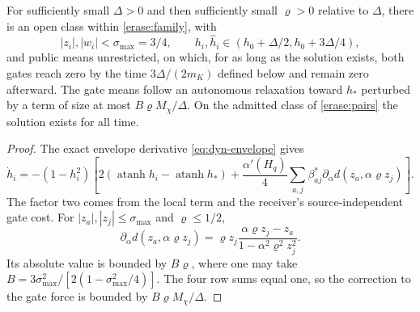 For sufficiently small $\Delta>0$ and then sufficiently small $\varrho>0$ relative to $\Delta$, there is an open class within \cref{erase:family}, with
\begin{equation}
 |z_i|,|w_i|<\sigma_{\max}=3/4,\qquad
 h_i,\widehat h_i\in(h_0+\Delta/2,h_0+3\Delta/4),
 \label{erase:initial-gates}
\end{equation}
and public means unrestricted, on which, for as long as the solution exists, both gates reach zero by the time $3\Delta/(2m_K)$ defined below and remain zero afterward. The gate means follow an autonomous relaxation toward $h_*$ perturbed by a term of size at most $B\varrho M_\chi/\Delta$. On the admitted class of \cref{erase:pairs} the solution exists for all time.
\begin{proof}
The exact envelope derivative \cref{eq:dyn-envelope} gives
\begin{equation}
 \dot h_i=-(1-h_i^2)\left[
 2(\operatorname{atanh}h_i-\operatorname{atanh}h_*)+
 \frac{\alpha'(H_q)}4\sum_{a,j}\beta_{aj}^*
       \partial_\alpha d(z_a,\alpha\varrho z_j)\right].
 \label{erase:gate-flow}
\end{equation}
The factor two comes from the local term and the receiver's source-independent gate cost. For $|z_a|,|z_j|\leq\sigma_{\max}$ and $\varrho\leq1/2$,
\begin{equation}
 \partial_\alpha d(z_a,\alpha\varrho z_j)
 =\varrho z_j\frac{\alpha\varrho z_j-z_a}
                       {1-\alpha^2\varrho^2z_j^2}.
 \label{erase:gate-derivative}
\end{equation}
Its absolute value is bounded by $B\varrho$, where one may take
$B=3\sigma_{\max}^2/[2(1-\sigma_{\max}^2/4)]$. The four row sums equal one, so the correction to the gate force is bounded by $B\varrho M_\chi/\Delta$.


\end{proof}
